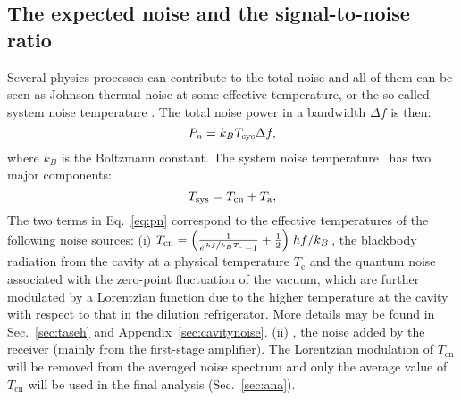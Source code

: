 \subsection{The expected noise and the signal-to-noise ratio}
\label{sec:intronoise}
Several physics processes can contribute to the total noise and all of them 
can be seen as Johnson thermal noise at some effective temperature, or the 
so-called system noise temperature \tsys. The total noise power in a 
bandwidth $\Delta f$ is then:
\begin{equation}
  P_n = k_BT_\text{sys} \Delta f, 
\end{equation}
where $k_B$ is the Boltzmann constant. 
The system noise temperature \tsys\ has two major components: 
\begin{equation}
  T_\text{sys} = T_\text{cn}  + T_\text{a},
\label{eq:pn}
\end{equation}
 The two terms in Eq.~\eqref{eq:pn} correspond to the effective 
temperatures of the following noise sources: %
(i) 
$T_\text{cn}=\left(\frac{1}{e^{\left.hf\middle/k_BT_\mathrm{c}\right.}-1} + \frac{1}{2}\right)\left. hf\middle/k_B\right.$, the blackbody 
radiation from the cavity at a physical temperature $T_\mathrm{c}$ and 
the quantum noise associated with the zero-point fluctuation of the 
vacuum, which are further modulated by a Lorentzian function due to the 
higher temperature at the cavity with respect to that in the 
dilution refrigerator. 
More details may be found in Sec.~\ref{sec:taseh} and 
Appendix~\ref{sec:cavitynoise}. (ii) \ta, the 
noise added by the receiver (mainly from the first-stage amplifier). 
The Lorentzian modulation of $T_\text{cn}$ will be removed from 
the averaged noise spectrum and only the average value of $T_\text{cn}$ 
will be used in the final analysis (Sec.~\ref{sec:ana}).  

